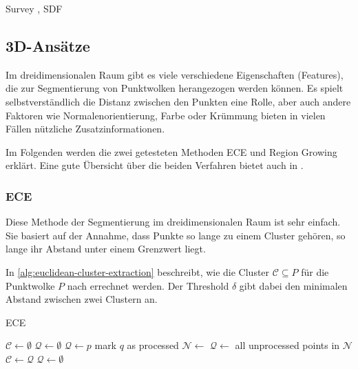 Survey \cite{shamir2008survey}, SDF \cite{shapira2008consistent}


\subsection{3D-Ansätze}
\label{subsec:3d-segmentation}

Im dreidimensionalen Raum gibt es viele verschiedene Eigenschaften (Features), die zur Segmentierung von Punktwolken herangezogen werden können.
Es spielt selbstverständlich die Distanz zwischen den Punkten eine Rolle, aber auch andere Faktoren wie Normalenorientierung, Farbe oder Krümmung bieten in vielen Fällen nützliche Zusatzinformationen.

Im Folgenden werden die zwei getesteten Methoden \ac{ECE} und Region Growing erklärt.
Eine gute Übersicht über die beiden Verfahren bietet auch \citeauthor{RusuDoctoralDissertation} in \cite[S.88--93]{RusuDoctoralDissertation}.

\subsubsection{\acl{ECE}}
\label{subsubsec:euclidean-cluster-extraction}

Diese Methode der Segmentierung im dreidimensionalen Raum ist sehr einfach.
Sie basiert auf der Annahme, dass Punkte so lange zu einem Cluster gehören, so lange ihr Abstand unter einem Grenzwert liegt.

In \autoref{alg:euclidean-cluster-extraction} beschreibt, wie die Cluster $\mathcal{C} \subseteq P$ für die Punktwolke $P$ nach \cite[S.89f]{RusuDoctoralDissertation} errechnet werden.
Der Threshold $\delta$ gibt dabei den minimalen Abstand zwischen zwei Clustern an.

\begin{algorithm}
\caption{\acl{ECE}}
\label{alg:euclidean-cluster-extraction}
\begin{algorithmic}
\State $\mathcal{C} \gets \emptyset$
\State $\mathcal{Q} \gets \emptyset$
	\State $\mathcal{Q} \gets p$
		\State mark $q$ as processed
		\State $\mathcal{N} \gets$ 
		\State $\mathcal{Q} \gets$ all unprocessed points in $\mathcal{N}$
	\EndFor
	\State $\mathcal{C} \gets \mathcal{Q}$
	\State $\mathcal{Q} \gets \emptyset$
\EndFor
\State {}
\end{algorithmic}
\end{algorithm}

